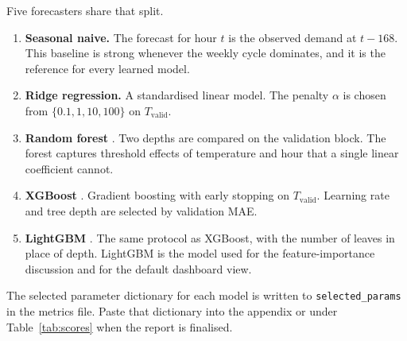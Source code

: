 Five forecasters share that split.

\begin{enumerate}[label=(\arabic*), itemsep=2pt]
  \item \textbf{Seasonal naive.} The forecast for hour \(t\) is the observed
        demand at \(t-168\). This baseline is strong whenever the weekly cycle
        dominates, and it is the reference for every learned model.
  \item \textbf{Ridge regression.} A standardised linear model. The penalty
        \(\alpha\) is chosen from \(\{0.1, 1, 10, 100\}\) on
        \(T_{\mathrm{valid}}\).
  \item \textbf{Random forest} \cite{breiman2001}. Two depths are compared on
        the validation block. The forest captures threshold effects of
        temperature and hour that a single linear coefficient cannot.
  \item \textbf{XGBoost} \cite{chen2016}. Gradient boosting with early
        stopping on \(T_{\mathrm{valid}}\). Learning rate and tree depth are
        selected by validation MAE.
  \item \textbf{LightGBM} \cite{ke2017}. The same protocol as XGBoost, with
        the number of leaves in place of depth. LightGBM is the model used
        for the feature-importance discussion and for the default dashboard
        view.
\end{enumerate}

The selected parameter dictionary for each model is written to
\texttt{selected\_params} in the metrics file. Paste that dictionary into
the appendix or under Table~\ref{tab:scores} when the report is finalised.
